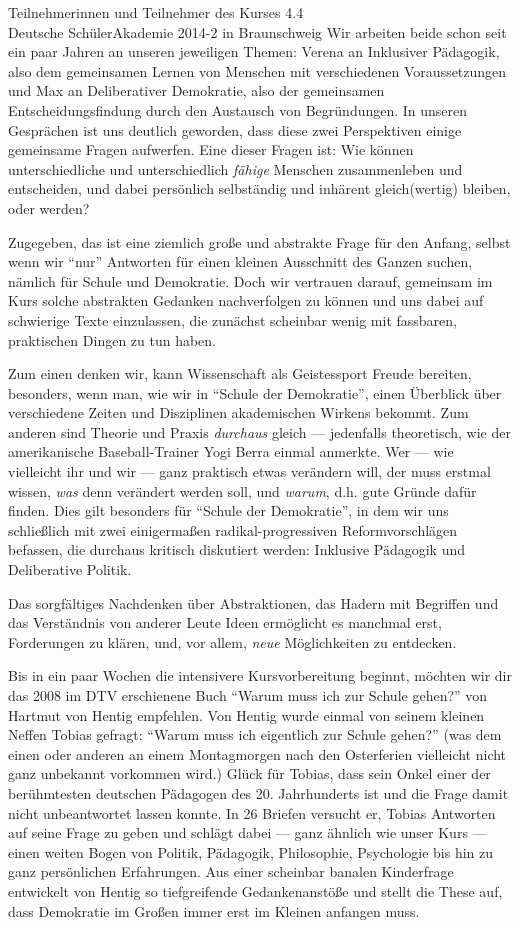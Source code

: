 \documentclass[a4paper]{letter}
\begin{document}
\begin{letter}{
	Teilnehmerinnen und Teilnehmer des Kurses 4.4 \\
	Deutsche SchülerAkademie 2014-2 in Braunschweig}
Wir arbeiten beide schon seit ein paar Jahren an unseren jeweiligen Themen: Verena an Inklusiver Pädagogik, also dem gemeinsamen Lernen von Menschen mit verschiedenen Voraussetzungen und Max an Deliberativer Demokratie, also der gemeinsamen Entscheidungsfindung durch den Austausch von Begründungen.
In unseren Gesprächen ist uns deutlich geworden, dass diese zwei Perspektiven einige gemeinsame Fragen aufwerfen.
Eine dieser Fragen ist:
Wie können unterschiedliche und unterschiedlich \emph{fähige} Menschen zusammenleben und entscheiden, und dabei persönlich selbständig und inhärent gleich(wertig) bleiben, oder werden?

Zugegeben, das ist eine ziemlich große und abstrakte Frage für den Anfang, selbst wenn wir ``nur'' Antworten für einen kleinen Ausschnitt des Ganzen suchen, nämlich für Schule und Demokratie.
Doch wir vertrauen darauf, gemeinsam im Kurs solche abstrakten Gedanken nachverfolgen zu können und uns dabei auf schwierige Texte einzulassen, die zunächst scheinbar wenig mit fassbaren, praktischen Dingen zu tun haben.

Zum einen denken wir, kann Wissenschaft als Geistessport Freude bereiten, besonders, wenn man, wie wir in ``Schule der Demokratie'', einen Überblick über verschiedene Zeiten und Disziplinen akademischen Wirkens bekommt.
Zum anderen sind Theorie und Praxis \emph{durchaus} gleich --- jedenfalls theoretisch, wie der amerikanische Baseball-Trainer Yogi Berra einmal anmerkte.
Wer --- wie vielleicht ihr und wir --- ganz praktisch etwas verändern will, der muss erstmal wissen, \emph{was} denn verändert werden soll, und \emph{warum}, d.h. gute Gründe dafür finden.
Dies gilt besonders für ``Schule der Demokratie'', in dem wir uns schließlich mit zwei einigermaßen radikal-progressiven Reformvorschlägen befassen, die durchaus kritisch diskutiert werden: Inklusive Pädagogik und Deliberative Politik.

Das sorgfältiges Nachdenken über Abstraktionen, das Hadern mit Begriffen und das Verständnis von anderer Leute Ideen ermöglicht es manchmal erst, Forderungen zu klären, und, vor allem, \emph{neue} Möglichkeiten zu entdecken.

Bis in ein paar Wochen die intensivere Kursvorbereitung beginnt, möchten wir dir das 2008 im DTV erschienene Buch ``Warum muss ich zur Schule gehen?'' von Hartmut von Hentig empfehlen.
Von Hentig wurde einmal von seinem kleinen Neffen Tobias gefragt: ``Warum muss ich eigentlich zur Schule gehen?'' (was dem einen oder anderen an einem Montagmorgen nach den Osterferien vielleicht nicht ganz unbekannt vorkommen wird.)
Glück für Tobias, dass sein Onkel einer der berühmtesten deutschen Pädagogen des 20. Jahrhunderts ist und die Frage damit nicht unbeantwortet lassen konnte.
In 26 Briefen versucht er, Tobias Antworten auf seine Frage zu geben und schlägt dabei --- ganz ähnlich wie unser Kurs --- einen weiten Bogen von Politik, Pädagogik, Philosophie, Psychologie bis hin zu ganz persönlichen Erfahrungen.
Aus einer scheinbar banalen Kinderfrage entwickelt von Hentig so tiefgreifende Gedankenanstöße und stellt die These auf, dass Demokratie im Großen immer erst im Kleinen anfangen muss.


\end{letter}
\end{document}
